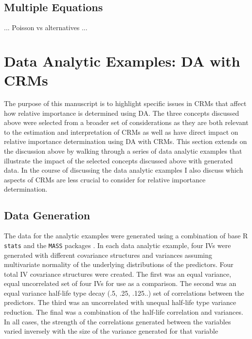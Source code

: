 \documentclass[ShortAfour,times,sageapa]{sagej}
\begin{document}
	
	\subsection{Multiple Equations}
	
	... Poisson vs alternatives ...
	
\section{Data Analytic Examples: DA with CRMs}

	
	
	
	The purpose of this manuscript is to highlight specific issues in CRMs that affect how relative importance is determined using DA.
	The three concepts discussed above were selected from a broader set of considerations as they are both relevant to the estimation and interpretation of CRMs as well as have direct impact on relative importance determination using DA with CRMs.
	This section extends on the discussion above by walking through a series of data analytic examples that illustrate the impact of the selected concepts discussed above with generated data.
	In the course of discussing the data analytic examples I also discuss which aspects of CRMs are less crucial to consider for relative importance determination.
	
	\subsection{Data Generation}
	
	The data for the analytic examples were generated using a combination of base R \texttt{stats} \cite{R} and the \texttt{MASS} packages \cite{MASS}.
	In each data analytic example, four IVs were generated with different covariance structures and variances assuming multivariate normality of the underlying distributions of the predictors.
	Four total IV covariance structures were created.  
	The first was an equal variance, equal uncorrelated set of four IVs for use as a comparison.  
	The second was an equal variance half-life type decay (.5, .25, .125..) set of correlations between the predictors.  
	The third was an uncorrelated with unequal half-life type variance reduction.  
	The final was a combination of the half-life correlation and variances.
	In all cases, the strength of the correlations generated between the variables varied inversely with the size of the variance generated for that variable %
	
\end{document}

